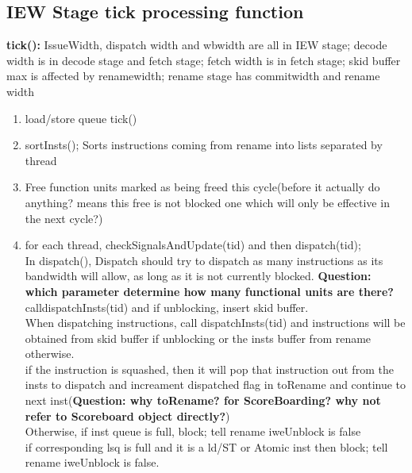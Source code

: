 \documentclass[11pt]{article}
\begin{document}
\subsection{IEW Stage tick processing function\\}

\textbf{tick():}
IssueWidth, dispatch width and wbwidth are all in IEW stage; decode width is in decode stage and fetch stage; fetch width is in fetch stage; skid buffer max is affected by renamewidth; rename stage has commitwidth and rename width
\begin{enumerate}
	\item load/store queue tick()
	\item sortInsts(); Sorts instructions coming from rename into lists separated by thread
	
	\item Free function units marked as being freed this cycle(before it actually do anything? means this free is not blocked one which will only be effective in the next cycle?)
	
	\item for each thread, checkSignalsAndUpdate(tid) and then dispatch(tid);\\
	
	In dispatch(), Dispatch should try to dispatch as many instructions as its bandwidth  will allow, as long as it is not currently blocked. \textbf{Question: which parameter determine how many functional units are there?} calldispatchInsts(tid) and if unblocking, insert skid buffer.\\
	
	When dispatching instructions, call dispatchInsts(tid) and instructions will be obtained from skid buffer if unblocking or the insts buffer from rename otherwise.\\
	
	if the instruction is squashed, then it will pop that instruction out from the insts to dispatch and increament dispatched flag in toRename and continue to next inst(\textbf{Question: why toRename? for ScoreBoarding? why not refer to Scoreboard object directly?})\\
	
	Otherwise, if inst queue is full, block; tell rename iweUnblock is false\\
	
	if corresponding lsq is full and it is a ld/ST or Atomic inst then block; tell rename iweUnblock is false.\\
	

\end{enumerate}
\end{document}
